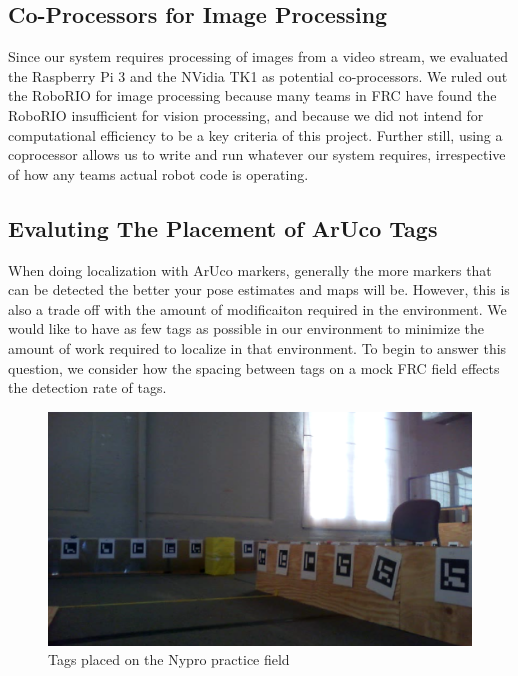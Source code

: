 \documentclass{article}
\begin{document}
	\subsection{Co-Processors for Image Processing}

    Since our system requires processing of images from a video stream, we evaluated the Raspberry Pi 3 and the NVidia TK1 as potential co-processors. We ruled out the RoboRIO for image processing because many teams in FRC have found the RoboRIO insufficient for vision processing, and because we did not intend for computational efficiency to be a key criteria of this project. Further still, using a coprocessor allows us to write and run whatever our system requires, irrespective of how any teams actual robot code is operating. %

  \subsection{Evaluting The Placement of ArUco Tags} \label{section:tag_placement}

    When doing localization with ArUco markers, generally the more markers that can be detected the better your pose estimates and maps will be. However, this is also a trade off with the amount of modificaiton required in the environment. We would like to have as few tags as possible in our environment to minimize the amount of work required to localize in that environment. To begin to answer this question, we consider how the spacing between tags on a mock FRC field effects the detection rate of tags.

    \begin{figure}[H]
      \centering
      \includegraphics[width=1\linewidth]{./images/nypro_tag_spacing.png}
      \caption{Tags placed on the Nypro practice field}
      \label{fig:nypro_tag_spacing}
    \end{figure}
\end{document}
